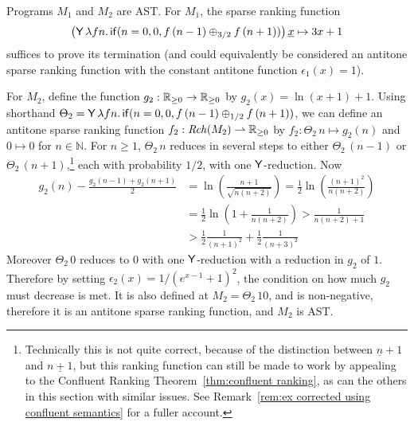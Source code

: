 \begin{example}
Programs $M_1$ and $M_2$ are AST. For $M_1$, the sparse ranking function 
\begin{align*}
\big(\mathsf{Y} \, \lambda f n . \, \mathsf{if}(n=0, 0, f \, (n-1) \oplus_{3/2} f \, (n+1))\big) \, \underline x \mapsto 3x + 1
\end{align*}
suffices to prove its termination (and could equivalently be considered an antitone sparse ranking function with the constant antitone function $\epsilon_1(x) = 1$).
\end{example}

\begin{example}
\label{ex:unbiased random walk}
For $M_2$, define the function $g_2 : \mathbb{R}_{{\geq}0} \to \mathbb{R}_{{\geq}0}$ by $g_2(x) = \ln(x+1) + 1$.
Using shorthand 
$\Theta_2 = \mathsf{Y} \, \lambda f n . \, 
\mathsf{if}(n = 0, 0, f \, (n - 1) \oplus_{1/2} f \, (n + 1))$, 
we can define an antitone sparse ranking function $f_2 : \mathit{Rch}(M_2) \rightharpoonup \mathbb{R}_{{\geq}0}$ 
by
\(
f_2: {\Theta_2} \, n \mapsto 
g_2(n)
\)
and
$0 \mapsto 0$
for $n \in \mathbb N$.
For $n \geq 1$, $\Theta_2 \, n$ reduces in several steps to either $\Theta_2 \, (n-1)$ or $\Theta_2 \, (n+1)$,\footnote{Technically this is not quite correct, because of the distinction between $\underline n + 1$ and $\underline{n + 1}$, but this ranking function can still be made to work by appealing to the Confluent Ranking Theorem~\ref{thm:confluent ranking}, as can the others in this section with similar issues. See Remark~\ref{rem:ex corrected using confluent semantics} for a fuller account.} each with probability $1/2$, with one $\mathsf{Y}$-reduction.
Now
\begin{align*}%
g_2(n) - \frac{g_2(n-1) + g_2(n+1)} 2 
  &=  \ln \left(\frac{n+1}{\sqrt{n(n+2)}}\right) 
  =  \frac 1 2 \ln\left(\frac{(n+1)^2}{n(n+2)}\right) \\
  &=  \frac 1 2 \ln\left(1 + \frac 1 {n(n+2)}\right) 
  >  \frac 1 {n(n+2) + 1} \\
  &>  \frac 1 2 \frac 1 {(n+1)^2} + \frac 1 2 \frac 1 {(n+3)^2}
\end{align*}
Moreover $\Theta_2 \, 0$ reduces to $0$ with one $\mathsf{Y}$-reduction with a reduction in $g_2$ of $1$.
Therefore by setting $\epsilon_2(x) = 1 / {(e^{x-1}+1)^2}$, the condition on how much $g_2$ must decrease is met. It is also defined at $M_2 = \Theta_2 \, 10$, and is non-negative, therefore it is an antitone sparse ranking function, and $M_2$ is AST.
\end{example}


